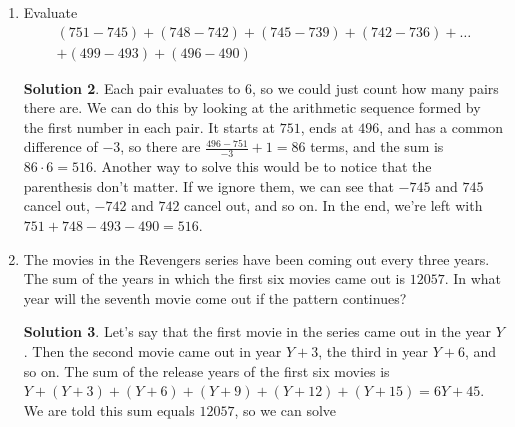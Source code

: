 \documentclass{article}
\theoremstyle{definition}
\newtheorem*{solution}{Solution}
\begin{document}
\begin{enumerate}
\begin{solution}
            traveled $20\left(\frac{2}{3}\right)$ between the first and the
            second bounce. The maximum height after the second bounce is
            $10\left(\frac{2}{3}\right)^2$ meters, so the ball traveled
            $20\left(\frac{2}{3}\right)^2$ meters between the second and third
            bounce. Notice that we have an infinite geometric series here, with
            first term $20\left(\frac{2}{3}\right) = \frac{40}{3}$ and common
            ratio $\frac{2}{3}$. Its sum is $\frac{\frac{40}{3}}{1 -
            \frac{2}{3}} = 40$. Adding the initial $10$ meter fall, we see that
            the ball will travel a total of $40 + 10 = 50$ meters.
        \end{solution}
        \item Evaluate
        \begin{multline*}
            (751 - 745) + (748 - 742) + (745 - 739) + (742 - 736) + \dots \\
            + (499 - 493) + (496 - 490)
        \end{multline*}
        \begin{solution}
            Each pair evaluates to $6$, so we could just count how many pairs
            there are. We can do this by looking at the arithmetic sequence
            formed by the first number in each pair. It starts at $751$, ends at
            $496$, and has a common difference of $-3$, so there are $\frac{496
            - 751}{-3} + 1 = 86$ terms, and the sum is $86 \cdot 6 = 516$.
            Another way to solve this would be to notice that the parenthesis
            don't matter. If we ignore them, we can see that $-745$ and $745$
            cancel out, $-742$ and $742$ cancel out, and so on. In the end,
            we're left with $751 + 748 - 493 - 490 = 516$.
        \end{solution}
        \item The movies in the Revengers series have been coming out every
        three years. The sum of the years in which the first six movies came out
        is $12057$. In what year will the seventh movie come out if the pattern
        continues?
        \begin{solution}
            Let's say that the first movie in the series came out in the year
            $Y$. Then the second movie came out in year $Y + 3$, the third in
            year $Y + 6$, and so on. The sum of the release years of the first
            six movies is $Y + (Y + 3) + (Y + 6) + (Y + 9) + (Y + 12) + (Y + 15)
            = 6Y + 45$. We are told this sum equals $12057$, so we can solve

\end{solution}
\end{enumerate}
\end{document}
